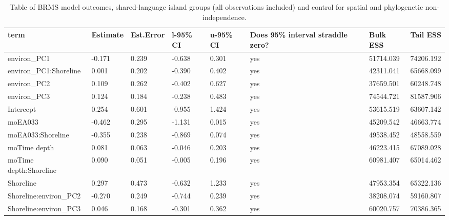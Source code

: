 \begin{table}[ht]
\centering
\begin{tabular}{p{5cm}p{2cm}p{2cm}p{2cm}p{2cm}p{2cm}p{2cm}p{2cm}}
  \toprule
term & Estimate & Est.Error & l-95\% CI & u-95\% CI & Does 95\% interval straddle zero? & Bulk ESS & Tail ESS \\ 
  \midrule
environ\_PC1 & -0.171 & 0.239 & -0.638 & 0.301 & yes & 51714.039 & 74206.192 \\ 
  environ\_PC1:Shoreline & 0.001 & 0.202 & -0.390 & 0.402 & yes & 42311.041 & 65668.099 \\ 
  environ\_PC2 & 0.109 & 0.262 & -0.402 & 0.627 & yes & 37659.501 & 60248.748 \\ 
  environ\_PC3 & 0.124 & 0.184 & -0.238 & 0.483 & yes & 74544.721 & 81587.906 \\ 
  Intercept & 0.254 & 0.601 & -0.955 & 1.424 & yes & 53615.519 & 63607.142 \\ 
  moEA033 & -0.462 & 0.295 & -1.131 & 0.015 & yes & 45209.542 & 46663.774 \\ 
  moEA033:Shoreline & -0.355 & 0.238 & -0.869 & 0.074 & yes & 49538.452 & 48558.559 \\ 
  moTime depth & 0.081 & 0.063 & -0.046 & 0.203 & yes & 46223.415 & 67089.028 \\ 
  moTime depth:Shoreline & 0.090 & 0.051 & -0.005 & 0.196 & yes & 60981.407 & 65014.462 \\ 
  Shoreline & 0.297 & 0.473 & -0.632 & 1.233 & yes & 47953.354 & 65322.136 \\ 
  Shoreline:environ\_PC2 & -0.270 & 0.249 & -0.744 & 0.239 & yes & 38208.074 & 59160.807 \\ 
  Shoreline:environ\_PC3 & 0.046 & 0.168 & -0.301 & 0.362 & yes & 60020.757 & 70386.365 \\ 
   \bottomrule
\end{tabular}
\caption{Table of BRMS model outcomes, shared-language island groups (all observations included) and control for spatial and phylogenetic non-independence.} 
\label{BRMS_effects_medium_control_sp}
\end{table}
